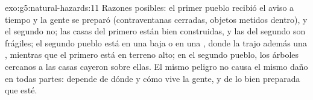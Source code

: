 \begin{solution}{exo:g5:natural-hazards:11}
Razones posibles: el primer pueblo recibió el aviso a tiempo y la gente se
preparó (contraventanas cerradas, objetos metidos dentro), y el segundo no;
las casas del primero están bien construidas, y las del segundo son
frágiles; el segundo pueblo está en una  baja o en una , donde la  trajo además una , mientras que el
primero está en terreno alto; en el segundo pueblo, los árboles cercanos a
las casas cayeron sobre ellas. El mismo peligro no causa el mismo daño en
todas partes: depende de dónde y cómo vive la gente, y de lo bien preparada
que esté.
\end{solution}
